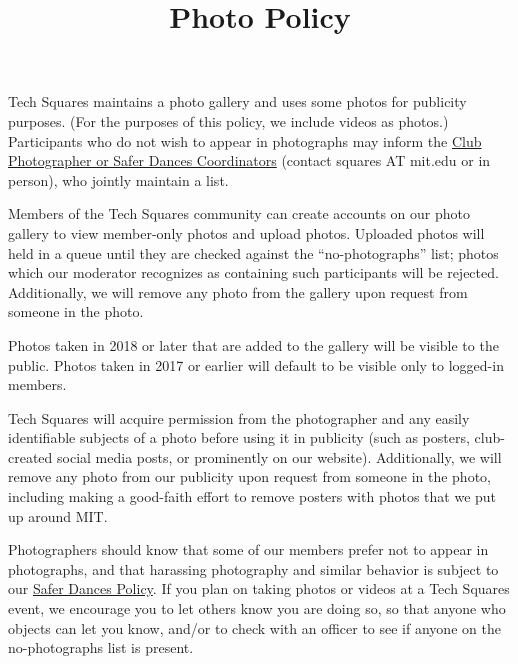 \documentclass{article}
\title{Photo Policy}
\date{}
\newcommand{\baseurl}{\latexhtml{http://www.mit.edu/~tech-squares/govdocs/}{}}
\newcommand{\matchextension}{.\latexhtml{pdf}{html}}
\newcommand{\matchlink}[2]{\href{\baseurl#1\matchextension}{#2}}
\begin{document}
\maketitle

Tech Squares maintains a photo gallery and uses some photos for publicity purposes. (For the purposes of this policy, we include videos as photos.) Participants who do not wish to appear in photographs may inform the \href{http://www.mit.edu/~tech-squares/officers.html}{Club Photographer or Safer Dances Coordinators} (contact squares AT mit.edu or in person), who jointly maintain a list.

Members of the Tech Squares community can create accounts on our photo gallery to view member-only photos and upload photos. Uploaded photos will held in a queue until they are checked against the ``no-photographs'' list; photos which our moderator recognizes as containing such participants will be rejected. Additionally, we will remove any photo from the gallery upon request from someone in the photo.

Photos taken in 2018 or later that are added to the gallery will be visible to the public. Photos taken in 2017 or earlier will default to be visible only to logged-in members.

Tech Squares will acquire permission from the photographer and any easily identifiable subjects of a photo before using it in publicity (such as posters, club-created social media posts, or prominently on our website). Additionally, we will remove any photo from our publicity upon request from someone in the photo, including making a good-faith effort to remove posters with photos that we put up around MIT.

Photographers should know that some of our members prefer not to appear in photographs, and that harassing photography and similar behavior is subject to our \matchlink{safer-dances}{Safer Dances Policy}. If you plan on taking photos or videos at a Tech Squares event, we encourage you to let others know you are doing so, so that anyone who objects can let you know, and/or to check with an officer to see if anyone on the no-photographs list is present.
\end{document}
